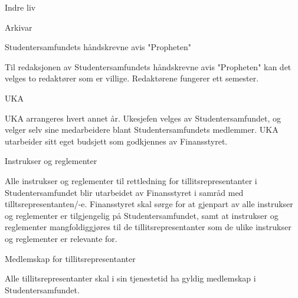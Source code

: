 \begin{lovkapittel}{Indre liv}
\begin{lovparagraf}{Arkivar}
  \end{lovparagraf}
  
  \begin{lovparagraf}{Studentersamfundets håndskrevne avis "Propheten"}
  
Til redaksjonen av Studentersamfundets håndskrevne avis "Propheten" kan det velges to redaktører som er villige.
Redaktørene fungerer ett semester.
  
  \end{lovparagraf}
  
  \begin{lovparagraf}{UKA}
  
UKA arrangeres hvert annet år. Ukesjefen velges av Studentersamfundet, og velger selv sine medarbeidere blant
Studentersamfundets medlemmer. UKA utarbeider sitt eget budsjett som godkjennes av Finansstyret.

  \end{lovparagraf}
  
  \begin{lovparagraf}{Instrukser og reglementer}
  
Alle instrukser og reglementer til rettledning for tillitsrepresentanter i Studentersamfundet blir utarbeidet av
Finansstyret i samråd med tilltsrepresentanten/-e. Finansstyret skal sørge for at gjenpart av alle instrukser og
reglementer er tilgjengelig på Studentersamfundet, samt at instrukser og reglementer mangfoldiggjøres til de
tillitsrepresentanter som de ulike instrukser og reglementer er relevante for.
  
  \end{lovparagraf}
  
  \begin{lovparagraf}{Medlemskap for tillitsrepresentanter}

Alle tillitsrepresentanter skal i sin tjenestetid ha gyldig medlemskap i Studentersamfundet.

  \end{lovparagraf}

\end{lovkapittel}


